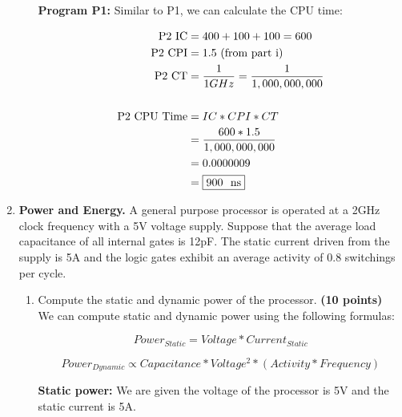 \documentclass[a4paper, 15pt]{exam}
\begin{document}
\begin{enumerate}
\begin{enumerate}
\textbf{Program P1:} Similar to P1, we can calculate the CPU time:

\begin{align*} 
   			\text{P2 IC} &= 400 + 100 + 100 = 600 \\
   			\text{P2 CPI} &= 1.5 \text{ (from part i)} \\
   			\text{P2 CT} &= \frac{1}{1 GHz} = \frac{1}{1,000,000,000} \\ \\
   			\text{P2 CPU Time} &= IC * CPI * CT \\
   			&= \frac{600 * 1.5}{1,000,000,000} \\
   			&= 0.0000009 \\
   			&= \fbox{900 \ ns}
   	\end{align*}

\end{enumerate}
    \item \textbf{Power and Energy.} A general purpose processor is operated at a 2GHz clock frequency with a 5V voltage supply. Suppose that the average load capacitance of all internal gates is 12pF. The static current driven from the supply is 5A and the logic gates exhibit an average activity of 0.8 switchings per cycle.
    \begin{enumerate}
    \item Compute the static and dynamic power of the processor. \textbf{(10 points)} \\
  We can compute static and dynamic power using the following formulas:
  
  $$Power_{Static} = Voltage * Current_{Static}$$
  
  $$Power_{Dynamic} \propto Capacitance * Voltage^2 * (Activity * Frequency)$$
  
  \textbf{Static power:} We are given the voltage of the processor is 5V and the static current is 5A.
  

\end{enumerate}
\end{enumerate}
\end{document}
